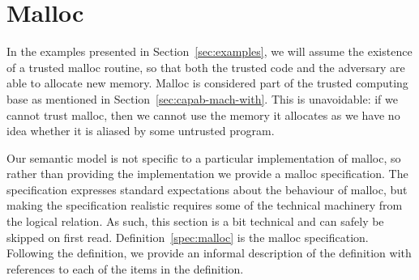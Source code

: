 \documentclass[format=acmsmall, review=true, screen=true]{acmart}
\renewcommand{\sectionname}{Section}
\newenvironment{toplas}{}{}
\begin{document}
\begin{toplas}
  \section{Malloc}
  \label{sec:malloc}
  In the examples presented in \sectionname~\ref{sec:examples}, we will assume the existence of a trusted malloc routine, so that both the trusted code and the adversary are able to allocate new memory.
  Malloc is considered part of the trusted computing base as mentioned in \sectionname~\ref{sec:capab-mach-with}.
  This is unavoidable: if we cannot trust malloc, then we cannot use the memory it allocates as we have no idea whether it is aliased by some untrusted program.

  Our semantic model is not specific to a particular implementation of malloc, so rather than providing the implementation we provide a malloc specification.
  The specification expresses standard expectations about the behaviour of malloc, but making the specification realistic requires some of the technical machinery from the logical relation.
  As such, this section is a bit technical and can safely be skipped on first read.
  Definition~\ref{spec:malloc} is the malloc specification.
  Following the definition, we provide an informal description of the definition with references to each of the items in the definition.


\end{toplas}
\end{document}
